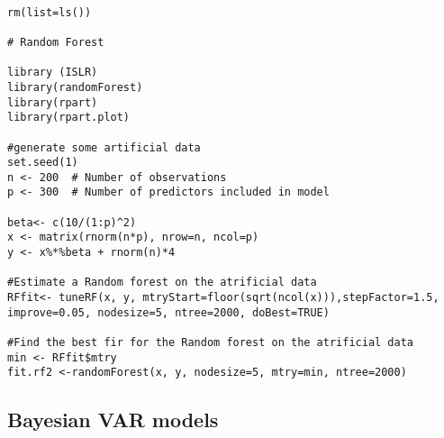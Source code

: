 \documentclass[12pt]{article}
\begin{document}
~\\ %
\begin{lstlisting}[title=\textbf{Random Forest}]
rm(list=ls())

# Random Forest

library (ISLR)
library(randomForest)
library(rpart)
library(rpart.plot)

#generate some artificial data
set.seed(1)
n <- 200  # Number of observations
p <- 300  # Number of predictors included in model

beta<- c(10/(1:p)^2)
x <- matrix(rnorm(n*p), nrow=n, ncol=p)
y <- x%*%beta + rnorm(n)*4

#Estimate a Random forest on the atrificial data
RFfit<- tuneRF(x, y, mtryStart=floor(sqrt(ncol(x))),stepFactor=1.5, improve=0.05, nodesize=5, ntree=2000, doBest=TRUE)

#Find the best fir for the Random forest on the atrificial data
min <- RFfit$mtry
fit.rf2 <-randomForest(x, y, nodesize=5, mtry=min, ntree=2000)
\end{lstlisting}

\subsection{Bayesian VAR models \textendash{} {\href{https://github.com/eurostat/econowcast/blob/master/model/BVAR.R}{}}}
\end{document}
